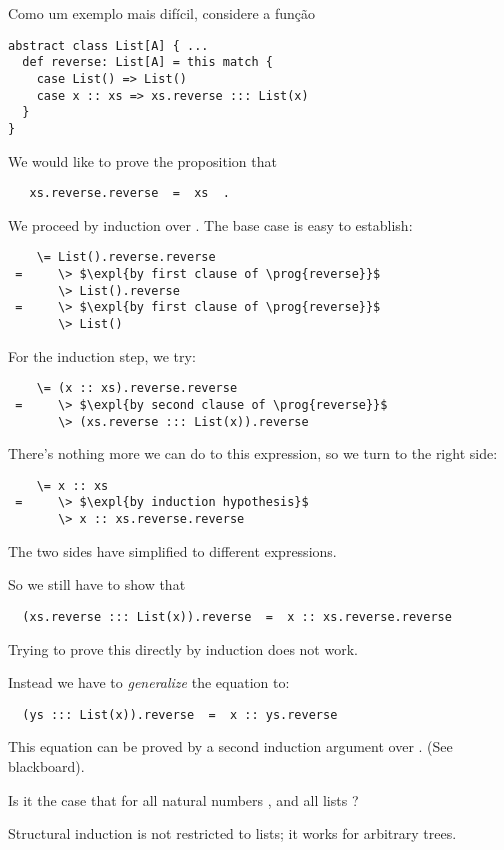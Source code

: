 {Como um exemplo mais dif\'{i}cil, considere a fun\c{c}\~{a}o
\begin{lstlisting}
abstract class List[A] { ...
  def reverse: List[A] = this match {
    case List() => List()
    case x :: xs => xs.reverse ::: List(x)
  }
}
\end{lstlisting}
We would like to prove the proposition that
\begin{lstlisting}
   xs.reverse.reverse  =  xs  .
\end{lstlisting}
We proceed by induction over . The base case is easy to establish:
\begin{lstlisting}
    \= List().reverse.reverse
 =     \> $\expl{by first clause of \prog{reverse}}$
       \> List().reverse
 =     \> $\expl{by first clause of \prog{reverse}}$
       \> List()
\end{lstlisting}
\es\bs
For the induction step, we try:
\begin{lstlisting}
    \= (x :: xs).reverse.reverse
 =     \> $\expl{by second clause of \prog{reverse}}$
       \> (xs.reverse ::: List(x)).reverse
\end{lstlisting}
There's nothing more we can do to this expression, so we turn to the right side:
\begin{lstlisting}
    \= x :: xs
 =     \> $\expl{by induction hypothesis}$
       \> x :: xs.reverse.reverse
\end{lstlisting}
The two sides have simplified to different expressions.

So we still have to show that
\begin{lstlisting}
  (xs.reverse ::: List(x)).reverse  =  x :: xs.reverse.reverse
\end{lstlisting}
Trying to prove this directly by induction does not work.

Instead we have to {\em generalize} the equation to:
\begin{lstlisting}
  (ys ::: List(x)).reverse  =  x :: ys.reverse
\end{lstlisting}
\es\bs
This equation can be proved by a second induction argument over .
(See blackboard).

\begin{exercise}
Is it the case that  for all 
natural numbers ,  and all lists ?
\end{exercise}

\es
{}

Structural induction is not restricted to lists; it works for arbitrary
trees.

}
